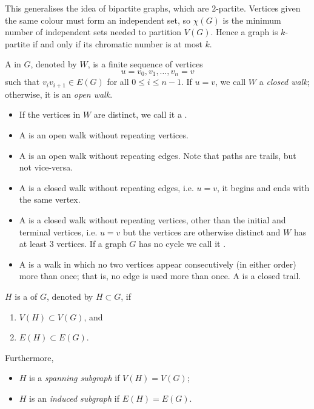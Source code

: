 This generalises the idea of bipartite graphs, which are $2$-partite. Vertices given the same colour must form an independent set, so $\chi(G)$ is the minimum number of independent sets needed to partition $V(G)$. Hence a graph is $k$-partite if and only if its chromatic number is at most $k$.

\begin{definition}[Walk]
A  in $G$, denoted by $W$, is a finite sequence of vertices 
\[u=v_0,v_1,\dots,v_n=v\]
such that $v_i v_{i+1} \in E(G)$ for all $0\le i\le n-1$. If $u=v$, we call $W$ a \emph{closed walk}; otherwise, it is an \emph{open walk}.
\begin{itemize}
\item If the vertices in $W$ are distinct, we call it a .
\item A  is an open walk without repeating vertices.
\item A  is an open walk without repeating edges. Note that paths are trails, but not vice-versa.
\item A  is a closed walk without repeating edges, i.e. $u=v$, it begins and ends with the same vertex.
\item A  is a closed walk without repeating vertices, other than the initial and terminal vertices, i.e. $u=v$ but the vertices are otherwise distinct and $W$ has at least 3 vertices. If a graph $G$ has no cycle we call it .
\item A  is a walk in which no two vertices appear consecutively (in either order) more than once; that is, no edge is used more than once. A  is a closed trail.
\end{itemize}
\end{definition}

\begin{definition}[Subgraph]
$H$ is a  of $G$, denoted by $H\subset G$, if
\begin{enumerate}[label=(\roman*)]
\item $V(H)\subset V(G)$, and
\item $E(H)\subset E(G)$. 
\end{enumerate}
Furthermore,
\begin{itemize}
\item $H$ is a \emph{spanning subgraph} if $V(H)=V(G)$;
\item $H$ is an \emph{induced subgraph} if $E(H)=E(G)$.
\end{itemize}
\end{definition}

